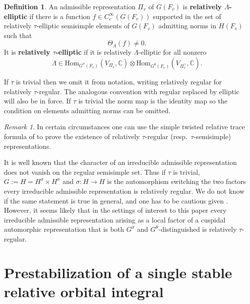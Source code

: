 \documentclass[12pt]{amsart}
\theoremstyle{remark}
\newtheorem*{rem}{Remark}
\numberwithin{equation}{section}
\newcommand{\CC}{\mathbb{C}}
\theoremstyle{definition}
\newtheorem{defn}[thm]{Definition}
\numberwithin{equation}{subsection}
\begin{document}
\begin{defn}
An admissible representation $\Pi_v$ of $G(F_v)$ is \textbf{relatively $\Lambda$-elliptic} if there is a function $f \in C_c^{\infty}(G(F_v))$ supported in the set of relatively $\tau$-elliptic semisimple elements of $G(F_v)$ admitting norms in $H(F_v)$ such that
$$
\Theta_{\Lambda}(f) \neq 0.
$$
 It is \textbf{relatively $\tau$-elliptic} if it is relatively $\Lambda$-elliptic for all nonzero
$$
 \Lambda \in  \mathrm{Hom}_{G^{\sigma}(F_v)}(V_{\Pi_v},\CC) \otimes \mathrm{Hom}_{G^{\theta}(F_v)}(V_{\Pi_v^{\vee}},\CC).
$$
\end{defn}
\noindent  If $\tau$ is trivial then we omit it from notation, writing relatively regular for relatively $\tau$-regular.  The analogous convention with regular replaced by elliptic will also be in force.  If $\tau$ is trivial the norm map is the identity map so the condition on elements admitting norms can be omitted.

\begin{rem}
In certain circumstances one can use the simple twisted relative trace formula of \cite{Hahn} to prove the existence of relatively $\tau$-regular (resp.~$\tau$-semisimple) representations.
\end{rem}

It is well known that the character of an irreducible admissible representation does not vanish on the regular semisimple set.  Thus if $\tau$ is trivial, $G:=H=H^{\sigma} \times H^{\sigma}$ and $\sigma:H \to H$ is the automorphism switching the two factors every irreducible admissible representation is relatively regular.  We do not know if the same statement is true in general, and one has to be cautious given \cite[\S 4]{RadRal}.  However, it seems likely that in the settings of interest to this paper every irreducible admissible representation arising as a local factor of a cuspidal automorphic representation that is both $G^{\sigma}$ and $G^{\theta}$-distinguished is relatively $\tau$-regular.




\section{Prestabilization of a single stable relative orbital integral} \label{sec-prestab}
\end{document}

